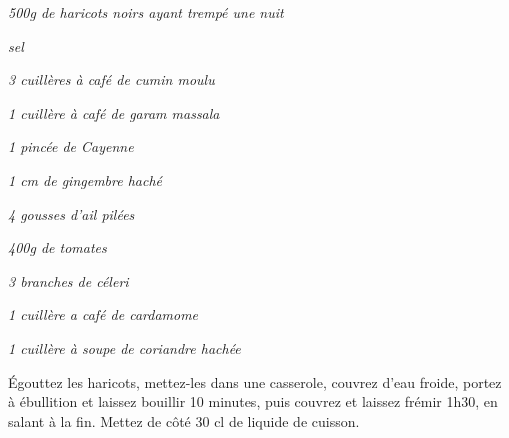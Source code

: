 \documentclass[10pt,a4paper]{report}
\begin{document}
    \begin{multicols}{2}
        \parbox[1cm]{\textwidth}{
            \begin{description}
                \item
                \textit{500g de haricots noirs ayant trempé une nuit}
                \item
                \textit{sel}
                \item
                \textit{3 cuillères à café de cumin moulu}
                \item
                \textit{1 cuillère à café de garam massala}
                \item
                \textit{1 pincée de Cayenne}
                \item
                \textit{1 cm de gingembre haché}
                \item
                \textit{4 gousses d'ail pilées}
                \item
                \textit{400g de tomates}
                \item
                \textit{3 branches de céleri}
                \item
                \textit{1 cuillère a café de cardamome}
                \item
                \textit{1 cuillère à soupe de coriandre hachée}
                \item
            \end{description}
        }
        \columnbreak

        Égouttez les haricots, mettez-les dans une casserole, couvrez d'eau froide, portez à ébullition et laissez bouillir 10 minutes, puis couvrez et laissez frémir 1h30, en salant à la fin. Mettez de côté 30 cl de liquide de cuisson.
        \newline


\end{multicols}
\end{document}
